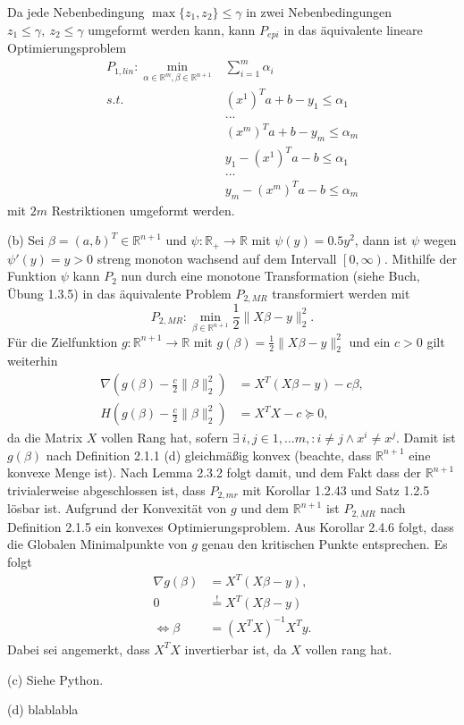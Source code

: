 \documentclass[ngerman, a4paper,12pt]{article}
\begin{document}
Da jede Nebenbedingung $\max\{z_1, z_2\} \leq \gamma$ in zwei Nebenbedingungen $z_1 \leq \gamma, \ z_2 \leq \gamma$ umgeformt werden kann, kann $P_{epi}$ in das äquivalente lineare Optimierungsproblem 
\begin{equation*}
	\begin{split}
	P_{1, lin}: \min_{\alpha \in \mathbb{R}^m, \beta \in \mathbb{R}^{n+1}} & \sum_{i=1}^{m} \alpha_i \\
	s.t. \ &(x^1)^Ta + b -y_1 \leq \alpha_1 \\
	& ... \\
	& (x^m)^Ta + b -y_m \leq \alpha_m \\
	& y_1 - (x^1)^Ta - b \leq \alpha_1 \\
	& ... \\
	& y_m - (x^m)^Ta - b \leq \alpha_m 
	\end{split}
\end{equation*}
mit $2m$ Restriktionen umgeformt werden. \par
(b) Sei $\beta = (a, b)^T \in \mathbb{R}^{n+1}$ und $\psi: \mathbb{R}_+ \rightarrow \mathbb{R}$ mit $\psi(y)=0.5y^2$, dann ist $\psi$ wegen $\psi'(y)=y > 0$ streng monoton wachsend auf dem Intervall $\left[0, \infty \right)$. Mithilfe der Funktion $\psi$ kann $P_2$ nun durch eine monotone Transformation (siehe Buch, Übung 1.3.5) in das äquivalente Problem $P_{2, MR}$ transformiert werden mit
\begin{equation*}
	P_{2, MR}:\min_{\beta \in \mathbb{R}^{n+1}} \frac{1}{2} \|X \beta - y \|_2^2.
\end{equation*}
Für die Zielfunktion $g: \mathbb{R}^{n+1} \rightarrow \mathbb{R}$ mit $g(\beta)= \frac{1}{2} \|X \beta - y \|_2^2$ und ein $c>0$ gilt weiterhin
\begin{equation*}
\begin{split}
	\nabla (g(\beta) - \frac{c}{2} \| \beta \|_2^2) &= X^T(X\beta - y) - c\beta, \\
	H(g(\beta) - \frac{c}{2} \| \beta \|_2^2) &= X^TX - c \succeq 0,
\end{split}
\end{equation*}
da die Matrix $X$ vollen Rang hat, sofern $\exists \ i,j \in {1, ...m ,}: i \neq j \wedge x^i \neq x^j$. Damit ist $g(\beta)$ nach Definition 2.1.1 (d) gleichmäßig konvex (beachte, dass $\mathbb{R}^{n+1}$ eine konvexe Menge ist). Nach Lemma 2.3.2 folgt damit, und dem Fakt dass der $\mathbb{R}^{n+1}$ trivialerweise abgeschlossen ist, dass $P_{2, mr}$ mit Korollar 1.2.43 und Satz 1.2.5 lösbar ist. Aufgrund der Konvexität von $g$ und dem $\mathbb{R}^{n+1}$ ist $P_{2,MR}$ nach Definition 2.1.5 ein konvexes Optimierungsproblem. Aus Korollar 2.4.6 folgt, dass die Globalen Minimalpunkte von $g$ genau den kritischen Punkte entsprechen. Es folgt
\begin{equation}
	\begin{split}
		\nabla g(\beta) &= X^T(X\beta -y),\\
		0 &\overset{!}{=} X^T(X\beta -y) \\
		\iff \beta	&=	(X^TX)^{-1}X^Ty.
	\end{split}
\end{equation}
Dabei sei angemerkt, dass $X^TX$ invertierbar ist, da $X$ vollen rang hat. \par
(c) Siehe Python. \par
(d) blablabla
\end{document}
